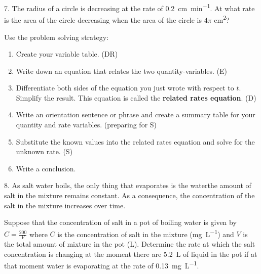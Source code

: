 \documentclass[10pt,oneside,]{book}
\newcommand{\terminology}[1]{\textbf{#1}}
\newcommand{\acronym}[1]{#1}
\theoremstyle{plain}
\theoremstyle{definition}
\numberwithin{equation}{section}
\begin{document}
\par\smallskip\noindent
\begin{exerciselist}
\item[7.]\hypertarget{exercise-548}{\null}The radius of a circle is decreasing at the rate of \SI{0.2}{\centi\meter\per\minute}. At what rate is the area of the circle decreasing when the area of the circle is \(4\pi\) \si{\centi\meter\tothe{2}}?%
\par
Use the problem solving strategy:%
\begin{enumerate}[label=(\alph*)]
\item{}Create your variable table. (\acronym{DR})\item{}Write down an equation that relates the two quantity-variables. (\acronym{E})\item{}Differentiate both sides of the equation you just wrote with respect to \(t\). Simplify the result. This equation is called the \terminology{related rates equation}. (\acronym{D})\item{}Write an orientation sentence or phrase and create a summary table for your quantity and rate variables. (preparing for \acronym{S})\item{}Substitute the known values into the related rates equation and solve for the unknown rate. (\acronym{S})\item{}Write a conclusion.\end{enumerate}
\par\smallskip
\item[8.]\hypertarget{exercise-549}{\null}As salt water boils, the only thing that evaporates is the water\textemdash{}the amount of salt in the mixture remains constant. As a consequence, the concentration of the salt in the mixture increases over time.%
\par
Suppose that the concentration of salt in a pot of boiling water is given by \(C=\frac{200}{V}\) where \(C\) is the concentration of salt in the mixture (\si{\milli\gram\per\liter}) and \(V\) is the total amount of mixture in the pot (\si{\liter}). Determine the rate at which the salt concentration is changing at the moment there are \SI{5.2}{\liter} of liquid in the pot if at that moment water is evaporating at the rate of \SI{0.13}{\milli\gram\per\liter}.%
\par\smallskip
\end{exerciselist}
\typeout{************************************************}
\typeout{************************************************}
\end{document}
